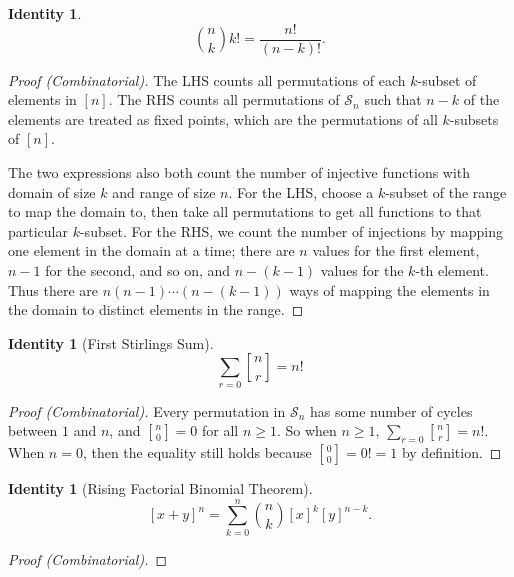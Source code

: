 \documentclass[12]{article}
\newcounter{identityCounter}
\newtheorem{iden}[identityCounter]{Identity}
\theoremstyle{definition}
\begin{document}
	\begin{iden}
		$${n \choose k} k! = \frac{n!}{(n-k)!}.$$
	\end{iden}
	\begin{proof}[Proof (Combinatorial)]
		The LHS counts all permutations of each $k$-subset of elements in $[n]$.  The RHS counts all permutations of $\mathcal{S}_n$ such that $n-k$ of the elements are treated as fixed points, which are the permutations of all $k$-subsets of $[n]$.  
		
		The two expressions also both count the number of injective functions with domain of size $k$ and range of size $n$.  For the LHS, choose a $k$-subset of the range to map the domain to, then take all permutations to get all functions to that particular $k$-subset.  For the RHS, we count the number of injections by mapping one element in the domain at a time; there are $n$ values for the first element, $n-1$ for the second, and so on, and $n-(k-1)$ values for the $k$-th element.  Thus there are $n(n-1)\cdots (n-(k-1))$ ways of mapping the elements in the domain to distinct elements in the range. 
	\end{proof}

	\begin{iden}[First Stirlings Sum]
		$$\sum_{r=0} {n \brack r} = n!$$
	\end{iden}
	\begin{proof}[Proof (Combinatorial)]
		Every permutation in $\mathcal{S}_n$ has some number of cycles between $1$ and $n$, and ${n \brack 0} = 0$ for all $n \geq 1$.  So when $n \geq 1$, $\sum_{r=0} {n \brack r} = n!$.  When $n=0$, then the equality still holds because ${0 \brack 0} = 0! = 1$ by definition.
	\end{proof}
	
	\begin{iden}[Rising Factorial Binomial Theorem]
		$$[x+y]^n = \sum_{k=0}^n {n \choose k}[x]^k [y]^{n-k}.$$
	\end{iden}
	\begin{proof}[Proof (Combinatorial)]
		
	\end{proof}
	
\end{document}

